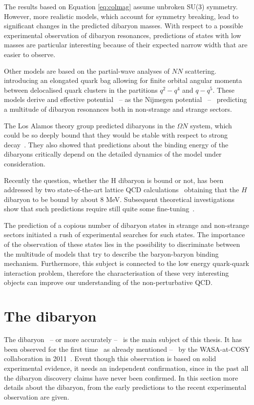 The results based on Equation \ref{eq:colmag} assume unbroken SU(3) symmetry.
However, more realistic models, which account for symmetry breaking, lead to significant changes
in the predicted dibaryon masses.
With respect to a possible experimental observation of dibaryon resonances, predictions of states
with low masses are particular interesting because of their expected narrow width that are easier
to observe.

Other models are based on the partial-wave analyses of $NN$ scattering.
introducing an elongated quark bag allowing for finite orbital angular momenta between
delocalised quark clusters in the partitions $q^{2}-q^{4}$ and $q-q^{5}$. 
These models derive and effective potential \ -- as the Nijmegen 
potential~\cite{dibpred1,dibpred2,dibpred3} -- \ predicting a multitude of dibaryon resonances
both in non-strange and strange sectors. 

The Los Alamos theory group predicted dibaryons in the $\Omega N$ system, which could be so
deeply bound that they would be stable with respect to strong 
decay~\cite{dsinevitable1,dsinevitable2}.
They also showed that predictions about the binding energy of the dibaryons critically depend
on the detailed dynamics of the model under consideration.

Recently the question, whether the H dibaryon is bound or not, has been addressed by two 
state-of-the-art lattice QCD calculations~\cite{Hlattice1,Hlattice2} obtaining
that the $H$ dibaryon to be bound by about 8 MeV.
Subsequent theoretical investigations show that such predictions require still quite some
fine-tuning~\cite{Hlattice3}.

The prediction of a copious number of dibaryon states in strange and non-strange sectors 
initiated a rush of experimental searches for such states. 
The importance of the observation of these states lies in the possibility to discriminate
between the multitude of models that try to describe the baryon-baryon binding mechanism.
Furthermore, this subject is connected to the low energy quark-quark interaction problem,
therefore the characterisation of these very interesting objects can improve our 
understanding of the non-perturbative QCD.

%
%
\section{The \dst dibaryon} \label{sec:2.2}

The \ds dibaryon \ -- or more accurately \dst -- \ is the main subject of this thesis.
It has been observed for the first time \ as already mentioned -- \ by the WASA-at-COSY 
collaboration in 2011~\cite{wasa1}.
Event though this observation is based on solid experimental evidence, it needs an independent
confirmation, since in the past all the dibaryon discovery claims have never been confirmed.
In this section more details about the \ds dibaryon, from the early predictions to the 
recent experimental observation are given.

